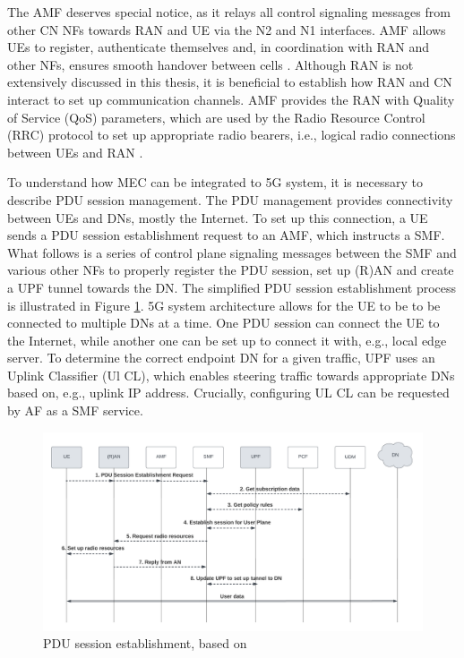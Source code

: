 \documentclass[12pt,a4paper,twoside]{report}
\begin{document}
The AMF deserves special notice, as it relays all control signaling messages from other CN NFs towards RAN and UE via the N2 and N1 interfaces. AMF allows UEs to register, authenticate themselves and, in coordination with RAN and other NFs, ensures smooth handover between cells \cite{rommer20195g}. Although RAN is not extensively discussed in this thesis, it is beneficial to establish how RAN and CN interact to set up communication channels. AMF provides the RAN with Quality of Service (QoS) parameters, which are used by the Radio Resource Control (RRC) protocol to set up appropriate radio bearers, i.e., logical radio connections between UEs and RAN \cite{dahlman-2020-5g}.
  
To understand how MEC can be integrated to 5G system, it is necessary to describe PDU session management. The PDU management provides connectivity between UEs and DNs, mostly the Internet. To set up this connection, a UE sends a PDU session establishment request to an AMF, which instructs a SMF. What follows is a series of control plane signaling messages between the SMF and various other NFs to properly register the PDU session, set up (R)AN and create a UPF tunnel towards the DN. The simplified PDU session establishment process is illustrated in Figure \ref{F:PDU-est}. 5G system architecture allows for the UE to be to be connected to multiple DNs at a time. One PDU session can connect the UE to the Internet, while another one can be set up to connect it with, e.g., local edge server. To determine the correct endpoint DN for a given traffic, UPF uses an Uplink Classifier (Ul CL), which enables steering traffic towards appropriate DNs based on, e.g., uplink IP address. Crucially, configuring UL CL can be requested by AF as a SMF service. \cite{rommer20195g}

\begin{figure}[ht]
	\centering
	\includegraphics[width=\textwidth]{./images/PDU-sesh-est.png}
	\caption{PDU session establishment, based on \cite{rommer20195g}}
	\label{F:PDU-est}
\end{figure}
\end{document}
